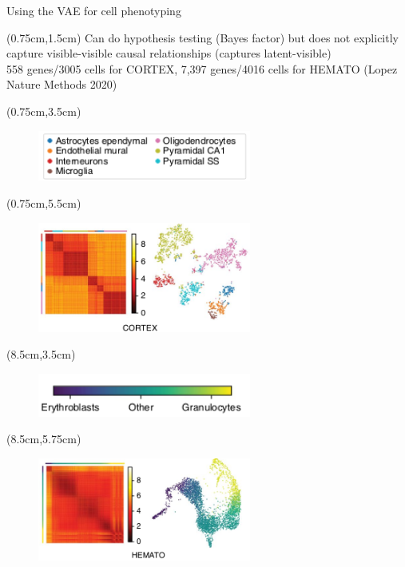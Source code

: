 \documentclass[aspectratio=1610]{beamer}					%
\begin{document}
\begin{frame}{Using the VAE for cell phenotyping}

\begin{textblock*}{15cm}(0.75cm,1.5cm)
Can do hypothesis testing (Bayes factor) but does not explicitly capture visible-visible causal relationships (captures latent-visible)\\
\vspace{0.1in}
558 genes/3005 cells for CORTEX, 7,397 genes/4016 cells for HEMATO (Lopez Nature Methods 2020)
\end{textblock*}
\begin{textblock*}{7cm}(0.75cm,3.5cm)
\begin{figure}
\includegraphics[width=7cm]{cortex-legend.png}
\end{figure}
\end{textblock*}
\begin{textblock*}{7cm}(0.75cm,5.5cm)
\begin{figure}
\includegraphics[width=7cm]{cortex.png}
\end{figure}
\end{textblock*}
\begin{textblock*}{7cm}(8.5cm,3.5cm)
\begin{figure}
\includegraphics[width=7cm]{hemato-legend.png}
\end{figure}
\end{textblock*}
\begin{textblock*}{7cm}(8.5cm,5.75cm)
\begin{figure}
\includegraphics[width=7cm]{hemato.png}
\end{figure}
\end{textblock*}
\end{frame}
\end{document}
